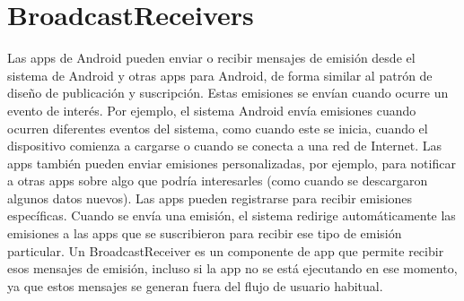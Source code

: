 \section{BroadcastReceivers}
Las apps de Android pueden enviar o recibir mensajes de emisión desde el sistema de Android y otras apps para Android, de forma similar al patrón de diseño de publicación y suscripción. Estas emisiones se envían cuando ocurre un evento de interés. Por ejemplo, el sistema Android envía emisiones cuando ocurren diferentes eventos del sistema, como cuando este se inicia, cuando el dispositivo comienza a cargarse o cuando se conecta a una red de Internet. Las apps también pueden enviar emisiones personalizadas, por ejemplo, para notificar a otras apps sobre algo que podría interesarles (como cuando se descargaron algunos datos nuevos).
Las apps pueden registrarse para recibir emisiones específicas. Cuando se envía una emisión, el sistema redirige automáticamente las emisiones a las apps que se suscribieron para recibir ese tipo de emisión particular.
Un BroadcastReceiver es un componente de app que permite recibir esos mensajes de emisión, incluso si la app no se está ejecutando en ese momento, ya que estos mensajes se generan fuera del flujo de usuario habitual.
\cite{androidDocs}

